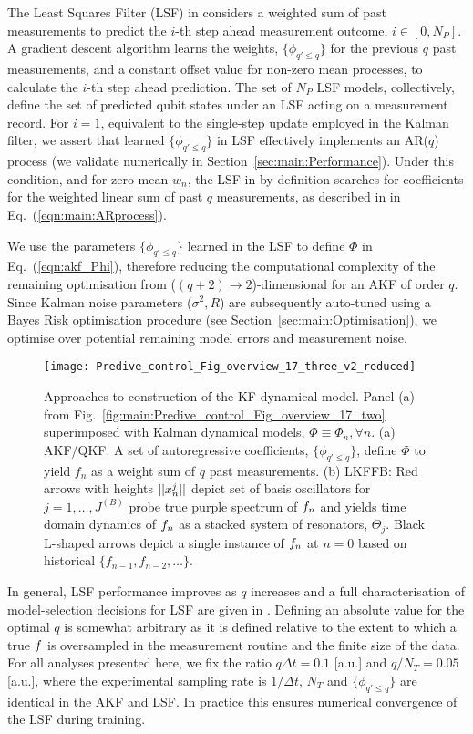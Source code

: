 The Least Squares Filter (LSF) in \cite{mavadia2017} considers a weighted sum of past measurements to predict the $i$-th step ahead measurement outcome, $i \in [0, N_P]$. A gradient descent algorithm learns the weights, $\{\phi_{q' \leq q}\}$ for the previous $q$ past measurements, and a constant offset value for non-zero mean processes, to calculate the $i$-th step ahead prediction. The set of $N_P$ LSF models, collectively, define the set of predicted qubit states under an LSF acting on a measurement record.  For $i=1$, equivalent to the single-step update employed in the Kalman filter, we assert that learned $\{\phi_{q' \leq q}\}$ in LSF effectively implements an AR($q$) process (we validate numerically in Section~\ref{sec:main:Performance}). Under this condition, and for zero-mean $w_n$, the LSF in \cite{mavadia2017} by definition searches for coefficients for the weighted linear sum of past $q$ measurements, as described in in Eq.~(\ref {eqn:main:ARprocess}). 

We use the parameters $\{\phi_{q' \leq q}\}$ learned in the LSF to define $\Phi$ in Eq.~(\ref {eqn:akf_Phi}), therefore reducing the computational complexity of the remaining optimisation from ($(q+2)\to 2$)-dimensional for an AKF of order $q$. Since Kalman noise parameters ($\sigma^2, R$) are subsequently auto-tuned using a Bayes Risk optimisation procedure (see Section~\ref{sec:main:Optimisation}), we optimise over potential remaining model errors and measurement noise.  

\begin{figure} [tp]
	\texttt{[image: Predive\_control\_Fig\_overview\_17\_three\_v2\_reduced]}
	\caption{\label{Predive_control_Fig_overview_17_three} Approaches to construction of the KF dynamical model.  Panel (a) from Fig.~\ref{fig:main:Predive_control_Fig_overview_17_two} superimposed with Kalman dynamical models, $\Phi \equiv \Phi_n, \forall n$.  (a) AKF/QKF: A set of autoregressive coefficients, $\{\phi_{q'\leq q}\}$, define $\Phi$ to yield $f_n$ as a weight sum of $q$ past measurements. (b) LKFFB: Red arrows with heights $||x^j_n||$ depict set of basis oscillators for $j = 1, \hdots, J^{(B)}$ probe true purple spectrum of $f_n$ and yields time domain dynamics of $f_n$ as a stacked system of resonators, $\Theta_j$. Black L-shaped arrows depict a single instance of $f_n$ at $n=0$ based on historical $\{f_{n-1}, f_{n-2}, \hdots\} $.} 	
\end{figure}

In general, LSF performance improves as $q$ increases and a full characterisation of model-selection decisions for LSF are given in \cite{mavadia2017}. Defining an absolute value for the optimal $q$ is somewhat arbitrary as it is defined relative to the extent to which a true $f$ is oversampled in the measurement routine and the finite size of the data. For all analyses presented here, we fix the ratio $q \Delta t = 0.1 $ [a.u.] and $q / N_T = 0.05$ [a.u.], where the experimental sampling rate is $1/\Delta t$, $N_T$ and $\{\phi_{q' \leq q}\}$ are identical in the AKF and LSF.   In practice this ensures numerical convergence of the LSF during training.

